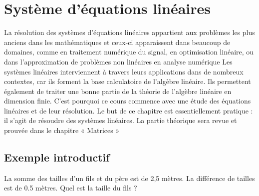\documentclass[a4paper]{book}
\begin{document}
\chapter*{Système d'équations linéaires}
La résolution des systèmes d'équations linéaires appartient aux problèmes les plus anciens dans les mathématiques et ceux-ci apparaissent dans beaucoup de domaines, comme en traitement numérique du signal, en optimisation linéaire, ou dans l'approximation de problèmes non linéaires en analyse numérique
Les systèmes linéaires interviennent à travers leurs applications dans de nombreux contextes, car ils forment la base
calculatoire de l'algèbre linéaire. Ils permettent également de traiter une bonne partie de la théorie de l'algèbre linéaire
en dimension finie. C'est pourquoi ce cours commence avec une étude des équations linéaires et de leur résolution.
Le but de ce chapitre est essentiellement pratique : il s'agit de résoudre des systèmes linéaires. La partie théorique
sera revue et prouvée dans le chapitre « Matrices »
\section{Exemple introductif}
La somme des tailles d'un fils et du père est de 2,5 mètres. La différence de tailles  est de 0.5 mètres.
Quel est la taille du fils ? 
\end{document}
